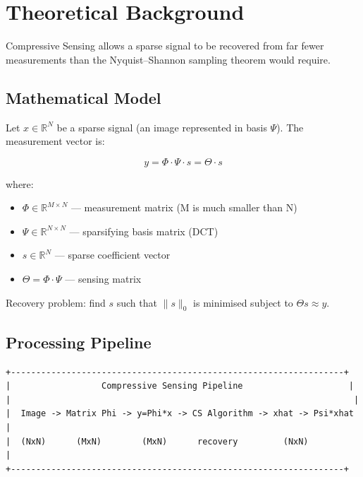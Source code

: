 \documentclass[12pt,a4paper]{article}
\begin{document}
\section{Theoretical Background}

Compressive Sensing allows a sparse signal to be recovered from far fewer
measurements than the Nyquist--Shannon sampling theorem would require.

\subsection{Mathematical Model}

Let $x \in \mathbb{R}^N$ be a sparse signal (an image represented in basis
$\Psi$).  The measurement vector is:

\begin{equation}
  y = \Phi \cdot \Psi \cdot s = \Theta \cdot s
\end{equation}

where:
\begin{itemize}
  \item $\Phi \in \mathbb{R}^{M \times N}$ --- measurement matrix
        (M is much smaller than N)
  \item $\Psi \in \mathbb{R}^{N \times N}$ --- sparsifying basis matrix (DCT)
  \item $s \in \mathbb{R}^N$ --- sparse coefficient vector
  \item $\Theta = \Phi \cdot \Psi$ --- sensing matrix
\end{itemize}

Recovery problem: find $s$ such that $\|s\|_0$ is minimised subject to
$\Theta s \approx y$.

\subsection{Processing Pipeline}

\begin{lstlisting}
+------------------------------------------------------------------+
|                  Compressive Sensing Pipeline                     |
|                                                                    |
|  Image -> Matrix Phi -> y=Phi*x -> CS Algorithm -> xhat -> Psi*xhat |
|  (NxN)      (MxN)        (MxN)      recovery         (NxN)          |
+------------------------------------------------------------------+
\end{lstlisting}
\end{document}
